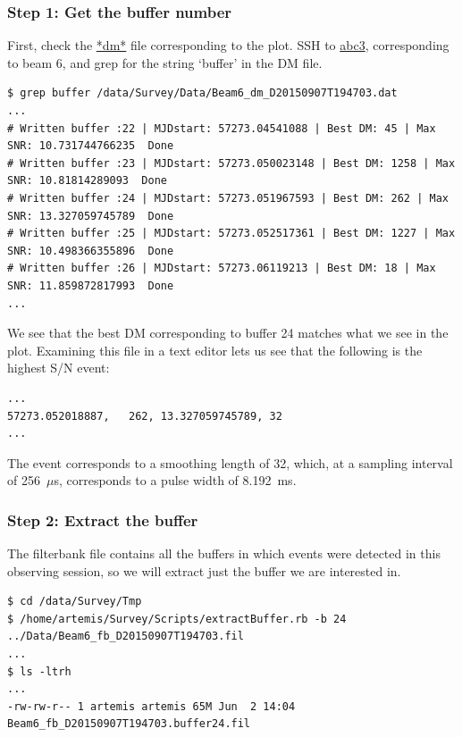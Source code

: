 \documentclass{article}
\begin{document}
\subsubsection*{Step 1: Get the buffer number}

First, check the \url{*dm*} file corresponding to the plot. SSH to \url{abc3},
corresponding to beam 6, and grep for the string `buffer' in the DM file.

\small{
\begin{verbatim}
$ grep buffer /data/Survey/Data/Beam6_dm_D20150907T194703.dat
...
# Written buffer :22 | MJDstart: 57273.04541088 | Best DM: 45 | Max SNR: 10.731744766235  Done
# Written buffer :23 | MJDstart: 57273.050023148 | Best DM: 1258 | Max SNR: 10.81814289093  Done
# Written buffer :24 | MJDstart: 57273.051967593 | Best DM: 262 | Max SNR: 13.327059745789  Done
# Written buffer :25 | MJDstart: 57273.052517361 | Best DM: 1227 | Max SNR: 10.498366355896  Done
# Written buffer :26 | MJDstart: 57273.06119213 | Best DM: 18 | Max SNR: 11.859872817993  Done
...
\end{verbatim}
}

We see that the best DM corresponding to buffer 24 matches what we see in the
plot. Examining this file in a text editor lets us see that the following is
the highest S/N event:

\small{
\begin{verbatim}
...
57273.052018887,   262, 13.327059745789, 32
...
\end{verbatim}
}

The event corresponds to a smoothing length of 32, which, at a sampling
interval of 256~$\mu$s, corresponds to a pulse width of 8.192~ms.


\subsubsection*{Step 2: Extract the buffer}

The filterbank file \url{} contains all the buffers in which events were
detected in this observing session, so we will extract just the buffer we are
interested in.

\small{
\begin{verbatim}
$ cd /data/Survey/Tmp
$ /home/artemis/Survey/Scripts/extractBuffer.rb -b 24 ../Data/Beam6_fb_D20150907T194703.fil
...
$ ls -ltrh
...
-rw-rw-r-- 1 artemis artemis 65M Jun  2 14:04 Beam6_fb_D20150907T194703.buffer24.fil
\end{verbatim}
}
\end{document}

